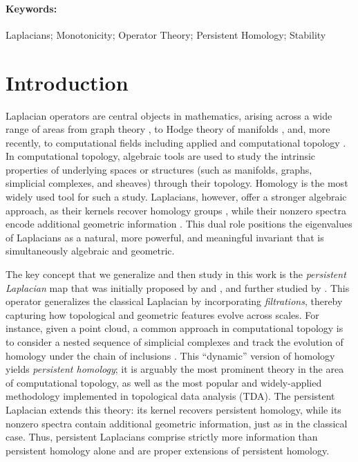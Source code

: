 \documentclass[11pt]{article}
\theoremstyle{definition}
\theoremstyle{remark}
\begin{document}
\paragraph{Keywords:} Laplacians; Monotonicity; Operator Theory; Persistent Homology; Stability\\

\vfill\eject

\tableofcontents


\section{Introduction}
\label{sec:intro}

Laplacian operators are central objects in mathematics, arising across a wide range of areas from graph theory \citep{graph_1, graph_2, graph_3,josthorak}, to Hodge theory of manifolds \citep{hodge_1, hodge_2, hodge_3,schwarz}, and, more recently, to computational fields including applied and computational topology \citep{tda_1, tda_2, tda_3,dws}. In computational topology, algebraic tools are used to study the intrinsic properties of underlying spaces or structures (such as manifolds, graphs, simplicial complexes, and sheaves) through their topology. Homology is the most widely used tool for such a study. Laplacians, however, offer a stronger algebraic approach, as their kernels recover homology groups \citep[see, e.g.,][p.~7]{survey}, while their nonzero spectra encode additional geometric information \citep{graphlaplacian,beers_mulas,curvature}. This dual role positions the eigenvalues of Laplacians as a natural, more powerful, and meaningful invariant that is simultaneously algebraic and geometric.

The key concept that we generalize and then study in this work is the \emph{persistent Laplacian} map that was initially proposed by \citet{first_peristent_lap2} and \citet{first_persistent_lap}, and further studied by \citet{mww}. This operator generalizes the classical Laplacian by incorporating \emph{filtrations}, thereby capturing how topological and geometric features evolve across scales. For instance, given a point cloud, a common approach in computational topology is to consider a nested sequence of simplicial complexes and track the evolution of homology under the chain of inclusions \citep[e.g.,][\S4.1]{roadmap}. This ``dynamic'' version of homology yields \emph{persistent homology}; it is arguably the most prominent theory in the area of computational topology, as well as the most popular and widely-applied methodology implemented in topological data analysis (TDA). The persistent Laplacian extends this theory: its kernel recovers persistent homology, while its nonzero spectra contain additional geometric information, just as in the classical case. Thus, persistent Laplacians comprise strictly more information than persistent homology alone and are proper extensions of persistent homology.
\end{document}
